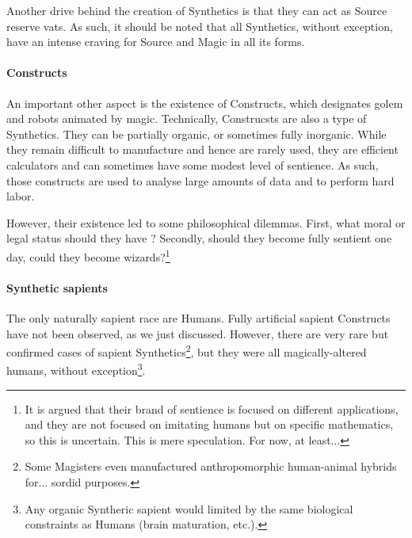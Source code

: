Another drive behind the creation of Synthetics is that they can act as Source reserve vats. As such, it should be noted that all Synthetics, without exception, have an intense craving for Source and Magic in all its forms.


\paragraph{Constructs}

An important other aspect is the existence of Constructs, which designates golem and robots animated by magic. Technically, Construcsts are also a type of Synthetics. They can be partially organic, or sometimes fully inorganic. While they remain difficult to manufacture and hence are rarely used, they are efficient calculators and can sometimes have some modest level of sentience. As such, those constructs are used to analyse large amounts of data and to perform hard labor. 

However, their existence led to some philosophical dilemmas. First, what moral or legal status should they have ? Secondly, should they become fully sentient one day, could they become wizards?\footnote{It is argued that their brand of sentience is focused on different applications, and they are not focused on imitating humans but on specific mathematics, so this is uncertain. This is mere speculation. For now, at least...} 


\paragraph{Synthetic sapients}

The only naturally sapient race are Humans. Fully artificial sapient Constructs have not been observed, as we just discussed. However, there are very rare but confirmed cases of sapient Synthetics\footnote{Some Magisters even manufactured anthropomorphic human-animal hybrids for... sordid purposes.}, but they were all magically-altered humans, without exception\footnote{Any organic Syntheric sapient would limited by the same biological constraints as Humans (brain maturation, etc.).}.




















